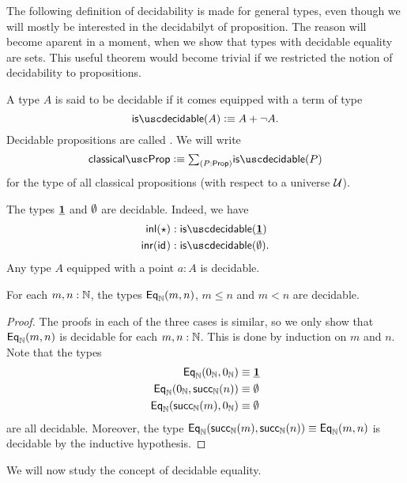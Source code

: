 The following definition of decidability is made for general types, even though we will mostly be interested in the decidabilyt of proposition. The reason will become aparent in a moment, when we show that types with decidable equality are sets. This useful theorem would become trivial if we restricted the notion of decidability to propositions.

\begin{defn}
  A type $A$ is said to be decidable if it comes equipped with a term of type
  \begin{equation*}
    \isdecidable(A)\defeq A+\neg A.
  \end{equation*}
  Decidable propositions are called . We will write
  \begin{equation*}
    \classicalprop \defeq \sm{P:\prop}\isdecidable(P)
  \end{equation*}
  for the type of all classical propositions (with respect to a universe $\mathcal{U}$).
\end{defn}

\begin{eg}
  The types $\underline{\mathbf{1}}$ and $\emptyset$ are decidable. Indeed, we have
  \begin{align*}
    \inl(\ttt) & :\isdecidable(\unit) \\
    \inr(\idfunc) & : \isdecidable(\emptyt).\qedhere
  \end{align*}
  Any type $A$ equipped with a point $a:A$ is decidable.
\end{eg}

\begin{lem}
  For each $m,n:{\mathbb{N}}$, the types $\mathsf{Eq}_{{\mathbb{N}}}(m,n)$, $m\leq n$ and $m<n$ are decidable.
\end{lem}

\begin{proof}
  The proofs in each of the three cases is similar, so we only show that $\mathsf{Eq}_{{\mathbb{N}}}(m,n)$ is decidable for each $m,n:{\mathbb{N}}$. This is done by induction on $m$ and $n$. Note that the types
  \begin{align*}
    \mathsf{Eq}_{{\mathbb{N}}}(0_{{\mathbb{N}}},0_{{\mathbb{N}}}) & \equiv \underline{\mathbf{1}} \\
    \mathsf{Eq}_{{\mathbb{N}}}(0_{{\mathbb{N}}},\mathsf{succ}_{{\mathbb{N}}}(n)) & \equiv \emptyset \\
    \mathsf{Eq}_{{\mathbb{N}}}(\mathsf{succ}_{{\mathbb{N}}}(m),0_{{\mathbb{N}}}) & \equiv \emptyset 
  \end{align*}
  are all decidable. Moreover, the type $\mathsf{Eq}_{{\mathbb{N}}}(\mathsf{succ}_{{\mathbb{N}}}(m),\mathsf{succ}_{{\mathbb{N}}}(n))\equiv \mathsf{Eq}_{{\mathbb{N}}}(m,n)$ is decidable by the inductive hypothesis.
\end{proof}

We will now study the concept of decidable equality.

